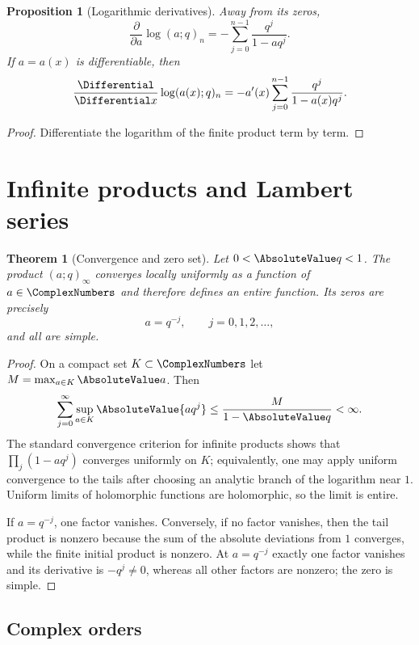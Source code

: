 \documentclass[11pt,a4paper,oneside,openany]{book}
\newtheorem{theorem}{Theorem}[chapter]
\newtheorem{proposition}[proposition]{Proposition}
\theoremstyle{definition}
\theoremstyle{remark}
\begin{document}
\begin{proposition}[Logarithmic derivatives]\label{prop:logder-finite}
Away from its zeros,
\[
 \frac{\partial}{\partial a}\log(a;q)_n
 =-\sum_{j=0}^{n-1}\frac{q^j}{1-aq^j}.
\]
If $a=a(x)$ is differentiable, then
\[
 \frac{\Differential}{\Differential x}\log(a(x);q)_n
 =-a'(x)\sum_{j=0}^{n-1}\frac{q^j}{1-a(x)q^j}.
\]
\end{proposition}

\begin{proof}
Differentiate the logarithm of the finite product term by term.
\end{proof}

\section{Infinite products and Lambert series}

\begin{theorem}[Convergence and zero set]\label{thm:poch-entire}
Let $0<\AbsoluteValue q<1$.  The product $(a;q)_\infty$ converges locally uniformly as a function of $a\in\ComplexNumbers$ and therefore defines an entire function.  Its zeros are precisely
\[
 a=q^{-j},\qquad j=0,1,2,\ldots,
\]
and all are simple.
\end{theorem}

\begin{proof}
On a compact set $K\subset\ComplexNumbers$ let $M=\max_{a\in K}\AbsoluteValue a$.  Then
\[
 \sum_{j=0}^{\infty}\sup_{a\in K}\AbsoluteValue{a q^j}
 \le \frac{M}{1-\AbsoluteValue q}<\infty.
\]
The standard convergence criterion for infinite products shows that
\(
 \prod_j(1-aq^j)
\)
converges uniformly on $K$; equivalently, one may apply uniform convergence to the tails after choosing an analytic branch of the logarithm near $1$.  Uniform limits of holomorphic functions are holomorphic, so the limit is entire.

If $a=q^{-j}$, one factor vanishes.  Conversely, if no factor vanishes, then the tail product is nonzero because the sum of the absolute deviations from $1$ converges, while the finite initial product is nonzero.  At $a=q^{-j}$ exactly one factor vanishes and its derivative is $-q^j\ne0$, whereas all other factors are nonzero; the zero is simple.
\end{proof}

\subsection{Complex orders}
\end{document}
